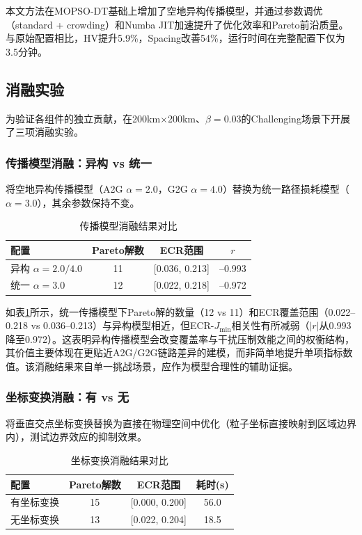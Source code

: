 本文方法在MOPSO-DT基础上增加了空地异构传播模型，并通过参数调优（standard + crowding）和Numba JIT加速提升了优化效率和Pareto前沿质量。与原始配置相比，HV提升5.9\%，Spacing改善54\%，运行时间在完整配置下仅为3.5分钟。

\subsection{消融实验}

为验证各组件的独立贡献，在200km$\times$200km、$\beta=0.03$的Challenging场景下开展了三项消融实验。

\subsubsection{传播模型消融：异构 vs 统一}

将空地异构传播模型（A2G $\alpha=2.0$，G2G $\alpha=4.0$）替换为统一路径损耗模型（$\alpha=3.0$），其余参数保持不变。

\begin{table}[t]
\centering
\caption{传播模型消融结果对比}
\label{tab:ablation_prop}
\begin{tabular}{lccc}
\toprule
配置 & Pareto解数 & ECR范围 & $r$ \\
\midrule
异构 $\alpha=2.0/4.0$ & 11 & [0.036, 0.213] & --0.993 \\
统一 $\alpha=3.0$ & 12 & [0.022, 0.218] & --0.972 \\
\bottomrule
\end{tabular}
\end{table}

如表\ref{tab:ablation_prop}所示，统一传播模型下Pareto解的数量（12 vs 11）和ECR覆盖范围（0.022--0.218 vs 0.036--0.213）与异构模型相近，但ECR-$J_{\min}$相关性有所减弱（$|r|$从0.993降至0.972）。这表明异构传播模型会改变覆盖率与干扰压制效能之间的权衡结构，其价值主要体现在更贴近A2G/G2G链路差异的建模，而非简单地提升单项指标数值。该消融结果来自单一挑战场景，应作为模型合理性的辅助证据。

\subsubsection{坐标变换消融：有 vs 无}

将垂直交点坐标变换替换为直接在物理空间中优化（粒子坐标直接映射到区域边界内），测试边界效应的抑制效果。

\begin{table}[t]
\centering
\caption{坐标变换消融结果对比}
\label{tab:ablation_transform}
\begin{tabular}{lccc}
\toprule
配置 & Pareto解数 & ECR范围 & 耗时(s) \\
\midrule
有坐标变换 & 15 & [0.000, 0.200] & 56.0 \\
无坐标变换 & 13 & [0.022, 0.204] & 18.5 \\
\bottomrule
\end{tabular}
\end{table}

